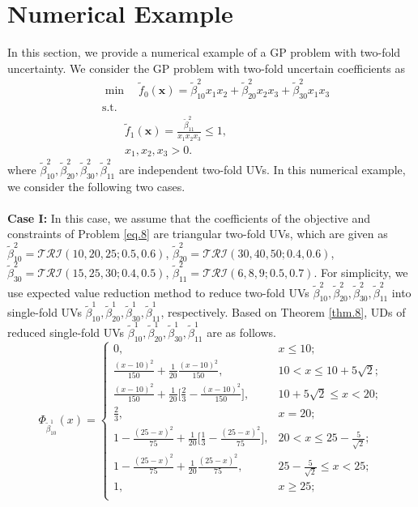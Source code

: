 \section{Numerical Example}\label{sec.5} In this section, we provide a numerical example of a GP problem with two-fold uncertainty. We consider the GP problem with two-fold uncertain coefficients as
\begin{equation}\label{eq.8}
	\begin{aligned}
		&	\min \quad \tilde{f}_0(\textbf{x})=\tilde{\beta}_{10}^2x_1 x_2+\tilde{\beta}_{20}^2x_2 x_3+
		\tilde{\beta}_{30}^2x_1 x_3\\
		&	\text{s.t.} \\
		&\qquad \tilde{f}_1(\textbf{x})= \frac{\tilde{\beta}_{11}^2}{x_1 x_2x_3}\leq 1,\\
		&\qquad	x_1,x_2,x_3>0.
	\end{aligned}
\end{equation}
where $\tilde{\beta}_{10}^2,\tilde{\beta}_{20}^2,\tilde{\beta}_{30}^2,\tilde{\beta}_{11}^2$ are independent two-fold UVs.
In this numerical example, we consider the following two cases.\\\\
\textbf{Case I:} In this case, we assume that the coefficients of the objective and constraints of Problem \ref{eq.8} are triangular two-fold UVs, which are given as $\tilde{\beta}_{10}^2=\mathcal{TRI}(10,20,25;0.5,0.6)$, $\tilde{\beta}_{20}^2=\mathcal{TRI}(30,40,50;0.4,0.6)$, $\tilde{\beta}_{30}^2=\mathcal{TRI}(15,25,30;0.4,0.5)$, $\tilde{\beta}_{11}^2=\mathcal{TRI}(6,8,9;0.5,0.7)$. For simplicity, we use expected value reduction method to reduce two-fold UVs $\tilde{\beta}_{10}^2,\tilde{\beta}_{20}^2,\tilde{\beta}_{30}^2,\tilde{\beta}_{11}^2$ into single-fold UVs $\tilde{\beta}_{10}^1,\tilde{\beta}_{20}^1,\tilde{\beta}_{30}^1,\tilde{\beta}_{11}^1$, respectively. Based on Theorem \ref{thm.8}, UDs of reduced single-fold UVs $\tilde{\beta}_{10}^1,\tilde{\beta}_{20}^1,\tilde{\beta}_{30}^1,\tilde{\beta}_{11}^1$ are as follows. 
\[\Phi_{\tilde{\beta}_{10}^1}(x)=\left\{
\begin{array}{ll}
	0, & x\leq 10;\\
	\frac{(x-10)^2}{150}+\frac{1}{20}\frac{(x-10)^2}{150}, & 10<x\leq 10+5\sqrt{2};\\
	\frac{(x-10)^2}{150}+\frac{1}{20}\big[\frac{2}{3}-\frac{(x-10)^2}{150}\big], & 10+5\sqrt{2}\leq x<20;\\
	\frac{2}{3}, & x=20;\\
	1-\frac{(25-x)^2}{75}+\frac{1}{20}\big[\frac{1}{3}-\frac{(25-x)^2}{75}\big], & 20<x\leq 25-\frac{5}{\sqrt{2}};\\
	1-\frac{(25-x)^2}{75}+\frac{1}{20}\frac{(25-x)^2}{75}, &  25-\frac{5}{\sqrt{2}}\leq x<25;\\
	1, & x\geq 25;\\
\end{array}
\right.
\]

